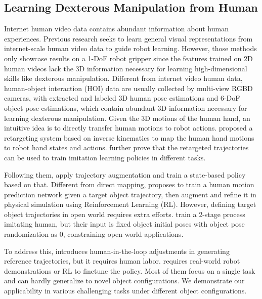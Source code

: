 \documentclass[letterpaper]{article}
\begin{document}
\subsection{Learning Dexterous Manipulation from Human}
Internet human video data contains abundant information about human experiences. Previous research \cite{mendonca2023structured, ma2022vip, nair2022r3m} seeks to learn general visual representations from internet-scale human video data to guide robot learning. However, those methods only showcase results on a 1-DoF robot gripper since the features trained on 2D human videos lack the 3D information necessary for learning high-dimensional skills like dexterous manipulation. Different from internet video human data, human-object interaction (HOI) data \cite{chao2021dexycb, fan2023arctic, liu2022hoi4d} are usually collected by multi-view RGBD cameras, with extracted and labeled 3D human pose estimations and 6-DoF object pose estimations, which contain abundant 3D information necessary for learning dexterous manipulation. Given the 3D motions of the human hand, an intuitive idea is to directly transfer human motions to robot actions. \cite{qin2023anyteleop} proposed a retargeting system based on inverse kinematics to map the human hand motions to robot hand states and actions. \cite{qin2022dexmv,liu2025dextrack} further prove that the retargeted trajectories can be used to train imitation learning policies in different tasks.

Following them, \cite{chen2024vividex, zhou2024learning, shi2025learning} apply trajectory augmentation and train a state-based policy based on that. Different from direct mapping, \cite{chen2024object} proposes to train a human motion prediction network given a target object trajectory, then augment and refine it in physical simulation using Reinforcement Learning (RL). However, defining target object trajectories in open world requires extra efforts. \cite{li2025maniptrans} train a 2-stage process imitating human, but their input is fixed object initial poses with object pose randomization as 0, constraining open-world applications.

To address this, \cite{zhao2024dexh2r} introduces human-in-the-loop adjustments in generating reference trajectories, but it requires human labor.
\cite{singh2024hand} requires real-world robot demonstrations or RL to finetune the policy. Most of them focus on a single task and can hardly generalize to novel object configurations. We demonstrate our applicability in various challenging tasks under different object configurations.
\end{document}
